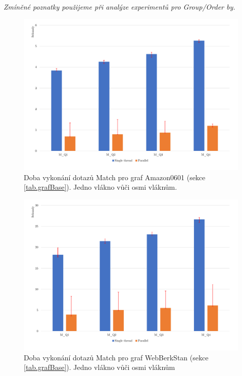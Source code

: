 \bigskip
\textit{Zmíněné poznatky použijeme při analýze experimentů pro Group/Order by.}

\begin{figure}[!htp]
\includegraphics[width=\linewidth]{../img/amazonMatch.pdf}\centering
\caption{Doba vykonání dotazů Match pro graf Amazon0601 (sekce \ref{tab.grafBase}). Jedno vlákno vůči osmi vláknům.}
\label{figure.amazonMatch}
\end{figure}

\begin{figure}[!htp]
\includegraphics[width=\linewidth]{../img/webberkstanMatch.pdf}\centering
\caption{Doba vykonání dotazů Match pro graf WebBerkStan (sekce \ref{tab.grafBase}). Jedno vlákno vůči osmi vláknům}
\label{figure.webberkstanMatch}
\end{figure}

